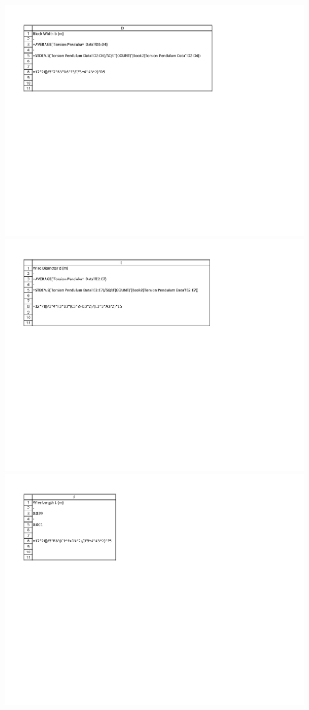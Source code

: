 \documentclass[leqno]{article}
\begin{document}
\includegraphics[width=\linewidth]{lab1datacf3}
\includegraphics[width=\linewidth]{lab1datacf4}
\includegraphics[width=\linewidth]{lab1datacf5}
\end{document}
